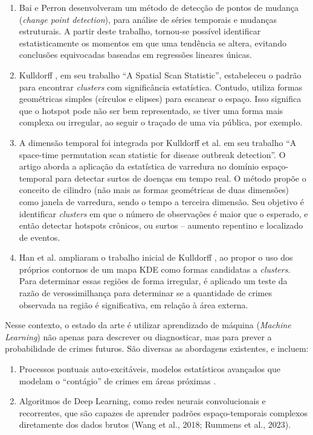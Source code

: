 \begin{enumerate}
  \item{Bai e Perron \cite{BaiAndPerron1998} desenvolveram um método de detecção de pontos de mudança (\textit{change point detection}), para análise de séries temporais e mudanças estruturais. A partir deste trabalho, tornou-se possível identificar estatisticamente os momentos em que uma tendência se altera, evitando conclusões equivocadas baseadas em regressões lineares únicas.}
  \item{Kulldorff \cite{Kulldorff1997}, em seu trabalho ``A Spatial Scan Statistic'', estabeleceu o padrão para encontrar \textit{clusters} com significância estatística. Contudo, utiliza formas geométricas simples (círculos e elipses) para escanear o espaço. Isso significa que o hotspot pode não ser bem representado, se tiver uma forma mais complexa ou irregular, ao seguir o traçado de uma via pública, por exemplo.}
  \item{A dimensão temporal foi integrada por Kulldorff et al. \cite{Kulldorff2005} em seu trabalho ``A space-time permutation scan statistic for disease outbreak detection''. O artigo aborda a aplicação da estatística de varredura no domínio espaço-temporal para detectar surtos de doenças em tempo real. O método propõe o conceito de cilindro (não mais as formas geométricas de duas dimensões) como janela de varredura, sendo o tempo a terceira dimensão. Seu objetivo é identificar \textit{clusters} em que o número de observações é maior que o esperado, e então detectar hotspots crônicos, ou surtos -- aumento repentino e localizado de eventos.}
  \item{Han et al. \cite{Han2019} ampliaram o trabalho inicial de Kulldorff \cite{Kulldorff1997}, ao propor o uso dos próprios contornos de um mapa KDE como formas candidatas a \textit{clusters}. Para determinar essas regiões de forma irregular, é aplicado um teste da razão de verossimilhança para determinar se a quantidade de crimes observada na região é significativa, em relação à área externa.}
\end{enumerate}

Nesse contexto, o estado da arte é utilizar aprendizado de máquina (\textit{Machine Learning}) não apenas para descrever ou diagnosticar, mas para prever a probabilidade de crimes futuros. São diversas as abordagens existentes, e incluem:

\begin{enumerate}
  \item{Processos pontuais auto-excitáveis, modelos estatísticos avançados que modelam o ``contágio'' de crimes em áreas próximas \cite{Mohler2011}.}
  \item{Algoritmos de Deep Learning, como redes neurais convolucionais e recorrentes, que são capazes de aprender padrões espaço-temporais complexos diretamente dos dados brutos (Wang et al., 2018; Rummens et al., 2023).}
\end{enumerate}

